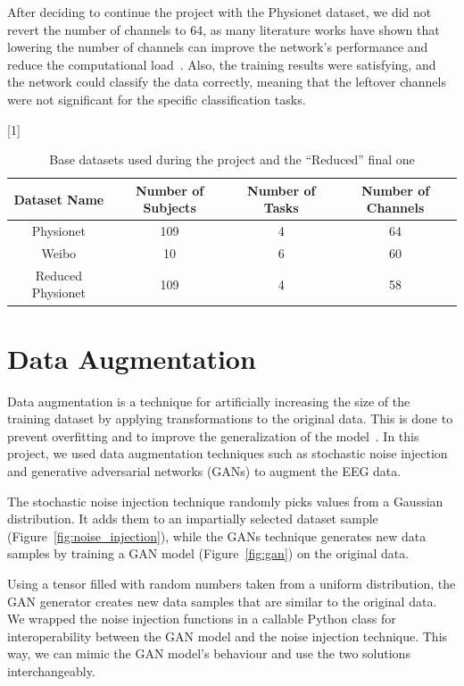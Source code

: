 After deciding to continue the project with the Physionet dataset, we did not revert the number of channels to 64, as many literature works have shown that lowering the number of channels can improve the network's performance and reduce the computational load~\cite{faye2022eeg}. Also, the training results were satisfying, and the network could classify the data correctly, meaning that the leftover channels were not significant for the specific classification tasks.

\begin{table}[!htbp]
    \centering
    \scalebox{.8}[1]{
    \begin{tabular}{|c|c|c|c|}
        \hline
        \textbf{Dataset Name} & \textbf{Number of Subjects} & \textbf{Number of Tasks} & \textbf{Number of Channels}\\
        \hline
        \hline
        Physionet & 109 & 4 & 64\\
        \hline
        Weibo & 10 & 6 & 60\\
        \hline
        \hline
        Reduced Physionet & 109 & 4 & 58\\
        \hline
    \end{tabular}
    }
    \caption{Base datasets used during the project and the ``Reduced'' final one}\label{tab:datasamples}
\end{table}


\section{Data Augmentation}
Data augmentation is a technique for artificially increasing the size of the training dataset by applying transformations to the original data.
This is done to prevent overfitting and to improve the generalization of the model~\cite{wen2020time}.
In this project, we used data augmentation techniques such as stochastic noise injection and generative adversarial networks (GANs) to augment the EEG data.

The stochastic noise injection technique randomly picks values from a Gaussian distribution. It adds them to an impartially selected dataset sample (Figure~\ref{fig:noise_injection}), while the GANs technique generates new data samples by training a GAN model (Figure~\ref{fig:gan}) on the original data.

Using a tensor filled with random numbers taken from a uniform distribution, the GAN generator creates new data samples that are similar to the original data.
We wrapped the noise injection functions in a callable Python class for interoperability between the GAN model and the noise injection technique.
This way, we can mimic the GAN model's behaviour and use the two solutions interchangeably.

